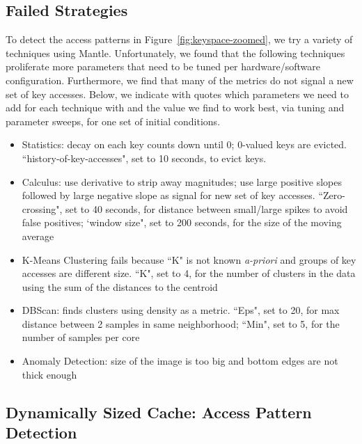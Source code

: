 \subsection{Failed Strategies}

To detect the access patterns in Figure~\ref{fig:keyspace-zoomed}, we try a
variety of techniques using Mantle. Unfortunately, we found that the following
techniques proliferate more parameters that need to be tuned per
hardware/software configuration. Furthermore, we find that many of the metrics
do not signal a new set of key accesses.  Below, we indicate with quotes which
parameters we need to add for each technique with and the value we find to work
best, via tuning and parameter sweeps, for one set of initial conditions.

\begin{itemize}

  \item Statistics: decay on each key counts down until 0; 0-valued keys are
evicted.  ``history-of-key-accesses", set to 10 seconds, to evict keys.

  \item Calculus: use derivative to strip away magnitudes; use large positive
slopes followed by large negative slope as signal for new set of key accesses.
``Zero-crossing", set to 40 seconds, for distance between small/large spikes to
avoid false positives; `window size", set to 200 seconds, for the size of the
moving average 

  \item K-Means Clustering fails because ``K" is not known {\it a-priori} and
groups of key accesses are different size. ``K", set to 4, for the number of clusters in the data
using the sum of the distances to the centroid

  \item DBScan: finds clusters using density as a metric. ``Eps", set to 20, for
max distance between 2 samples in same neighborhood; ``Min", set to 5, for the
number of samples per core

  \item Anomaly Detection: size of the image is too big and bottom edges are
not thick enough

\end{itemize}

\subsection{Dynamically Sized Cache: Access Pattern Detection}
\label{sec:regime-detection}

